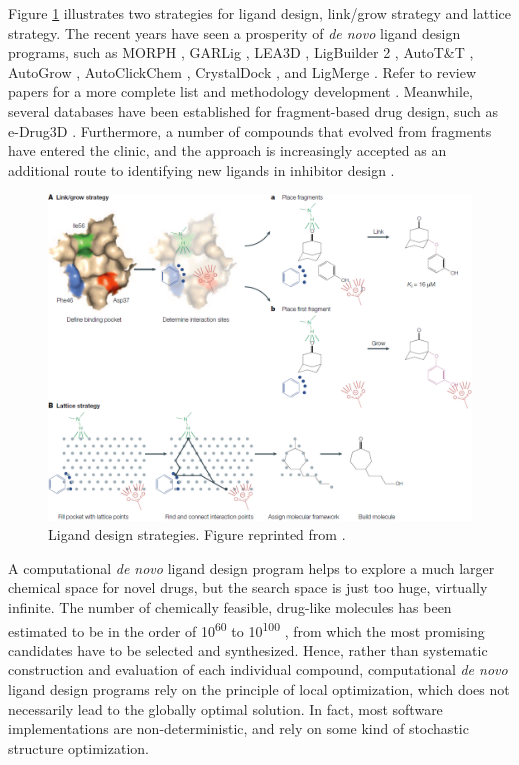 Figure \ref{igrow:LigandDesign} \citep{363} illustrates two strategies for ligand design, link/grow strategy and lattice strategy. The recent years have seen a prosperity of \textit{de novo} ligand design programs, such as MORPH \citep{365}, GARLig \citep{471}, LEA3D \citep{1223}, LigBuilder 2 \citep{749}, AutoT\&T \citep{780}, AutoGrow \citep{466}, AutoClickChem \citep{1051}, CrystalDock \citep{954}, and LigMerge \citep{1181}. Refer to review papers for a more complete list \citep{363,367,472,1006} and methodology development \citep{470,982}. Meanwhile, several databases have been established for fragment-based drug design, such as e-Drug3D \citep{1125}. Furthermore, a number of compounds that evolved from fragments have entered the clinic, and the approach is increasingly accepted as an additional route to identifying new ligands in inhibitor design \citep{363,367,472,474,1006}.

\begin{figure}[t]
\centering
\includegraphics[width=\textwidth]{igrow/LigandDesign.png}
\caption{Ligand design strategies. Figure reprinted from \citep{363}.}
\label{igrow:LigandDesign}
\end{figure}

A computational \textit{de novo} ligand design program helps to explore a much larger chemical space for novel drugs, but the search space is just too huge, virtually infinite. The number of chemically feasible, drug-like molecules has been estimated to be in the order of 10\textsuperscript{60} to 10\textsuperscript{100} \citep{1104}, from which the most promising candidates have to be selected and synthesized. Hence, rather than systematic construction and evaluation of each individual compound, computational \textit{de novo} ligand design programs rely on the principle of local optimization, which does not necessarily lead to the globally optimal solution. In fact, most software implementations are non-deterministic, and rely on some kind of stochastic structure optimization.

